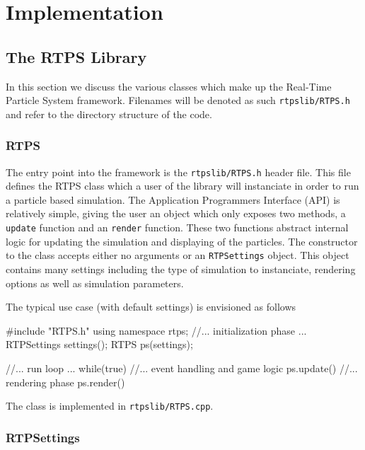 \chapter{Implementation}

\section{The RTPS Library}

In this section we discuss the various classes which make up the Real-Time
Particle System framework. Filenames will be denoted as such \verb|rtpslib/RTPS.h|
and refer to the directory structure of the code. 

\subsection{RTPS}

The entry point into the framework is the \verb|rtpslib/RTPS.h| header file. This file defines
the RTPS class which a user of the library will instanciate in order to run a
particle based simulation. The Application Programmers Interface (API) is
relatively simple, giving the user an object which only exposes two methods, a
\verb|update| function and an \verb|render| function. These two functions abstract
internal logic for updating the simulation and displaying of the particles. The
constructor to the class accepts either no arguments or an \verb|RTPSettings| object.
This object contains many settings including the type of simulation to
instanciate, rendering options as well as simulation parameters. 

The typical use case (with default settings) is envisioned as follows
\begin{cppcode}{0}
#include "RTPS.h"
using namespace rtps;
//... initialization phase ...
RTPSettings settings();
RTPS ps(settings);

//... run loop ...
while(true)
{
    //... event handling and game logic
    ps.update()
    //... rendering phase
    ps.render()
}

\end{cppcode}

The class is implemented in \verb|rtpslib/RTPS.cpp|.

\subsection{RTPSettings}

